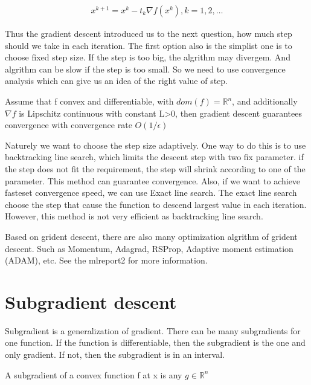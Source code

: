 \documentclass[aps,letterpaper,10pt]{article}
\begin{document}
\begin{align*}
  x^{k+1} = x^{k} − t_k \nabla f(x^{k}),k =1,2,\dots
\end{align*}


Thus the gradient descent introduced us to the next question, how much step should we take in each iteration.\vspace{3mm}
The first option also is the simplist one is to choose fixed step size. If the step is too big, the algrithm may divergem. And algrithm can be slow if the step is too small. So we need to use convergence analysis which can give us an idea of the right value of step.\vspace{3mm}

Assume that f convex and differentiable, with $dom(f) = \mathbb{R}^{n}$, and additionally $\nabla f$ is Lipschitz continuous with constant L>0, then gradient descent guarantees convergence with convergence rate $O(1/\epsilon)$ \vspace{3mm}

Naturely we want to choose the step size adaptively. One way to do this is to use backtracking line search, which limits the descent step with two fix parameter. if the step does not fit the requirement, the step will shrink according to one of the parameter. This method can guarantee convergence. Also, if we want to achieve fasteset convergence speed, we can use Exact line search. The exact line search choose the step that cause the function to descend largest value in each iteration. However, this method is not very efficient as backtracking line search. \vspace{3mm}

Based on grident descent, there are also many optimization algrithm of grident descent. Such as  Momentum, Adagrad, RSProp, Adaptive moment estimation (ADAM), etc. See the mlreport2 for more information. \vspace{3mm}

\section{Subgradient descent}
Subgradient is a generalization of gradient.
There can be many subgradients for one function. If the function is differentiable, then the subgradient is the one and only gradient. If not, then the subgradient is in an interval.\vspace{3mm}

A subgradient of a convex function f at x is any $g \in \mathbb{R}^{n}$
\end{document}
